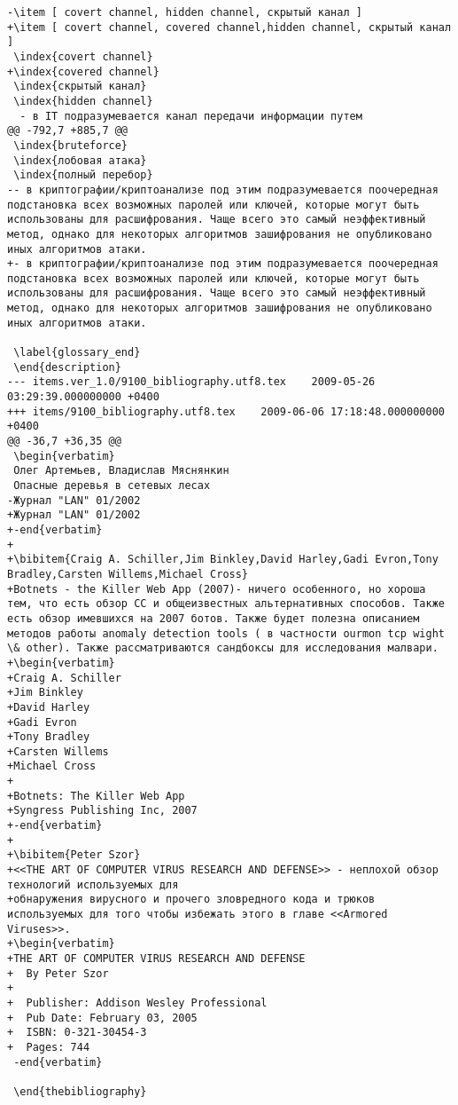 \begin{verbatim}
-\item [ covert channel, hidden channel, скрытый канал ]
+\item [ covert channel, covered channel,hidden channel, скрытый канал ]
 \index{covert channel}
+\index{covered channel}
 \index{скрытый канал}
 \index{hidden channel}
  - в IT подразумевается канал передачи информации путем
@@ -792,7 +885,7 @@
 \index{bruteforce}
 \index{лобовая атака}
 \index{полный перебор}
-- в криптографии/криптоанализе под этим подразумевается поочередная подстановка всех возможных паролей или ключей, которые могут быть использованы для расшифрования. Чаще всего это самый неэффективный метод, однако для некоторых алгоритмов зашифрования не опубликовано иных алгоритмов атаки.
+- в криптографии/криптоанализе под этим подразумевается поочередная подстановка всех возможных паролей или ключей, которые могут быть использованы для расшифрования. Чаще всего это самый неэффективный метод, однако для некоторых алгоритмов зашифрования не опубликовано иных алгоритмов атаки.

 \label{glossary_end}
 \end{description}
--- items.ver_1.0/9100_bibliography.utf8.tex	2009-05-26 03:29:39.000000000 +0400
+++ items/9100_bibliography.utf8.tex	2009-06-06 17:18:48.000000000 +0400
@@ -36,7 +36,35 @@
 \begin{verbatim}
 Олег Артемьев, Владислав Мяснянкин
 Опасные деревья в сетевых лесах
-Журнал "LAN" 01/2002
+Журнал "LAN" 01/2002
+-end{verbatim}
+
+\bibitem{Craig A. Schiller,Jim Binkley,David Harley,Gadi Evron,Tony Bradley,Carsten Willems,Michael Cross}
+Botnets - the Killer Web App (2007)- ничего особенного, но хороша тем, что есть обзор CC и общеизвестных альтернативных способов. Также есть обзор имевшихся на 2007 ботов. Также будет полезна описанием методов работы anomaly detection tools ( в частности ourmon tcp wight \& other). Также рассматриваются сандбоксы для исследования малвари.
+\begin{verbatim}
+Craig A. Schiller
+Jim Binkley
+David Harley
+Gadi Evron
+Tony Bradley
+Carsten Willems
+Michael Cross
+
+Botnets: The Killer Web App
+Syngress Publishing Inc, 2007
+-end{verbatim}
+
+\bibitem{Peter Szor}
+<<THE ART OF COMPUTER VIRUS RESEARCH AND DEFENSE>> - неплохой обзор технологий используемых для
+обнаружения вирусного и прочего зловредного кода и трюков используемых для того чтобы избежать этого в главе <<Armored Viruses>>.
+\begin{verbatim}
+THE ART OF COMPUTER VIRUS RESEARCH AND DEFENSE
+  By Peter Szor
+
+  Publisher: Addison Wesley Professional
+  Pub Date: February 03, 2005
+  ISBN: 0-321-30454-3
+  Pages: 744
 -end{verbatim}

 \end{thebibliography}
\end{verbatim}
